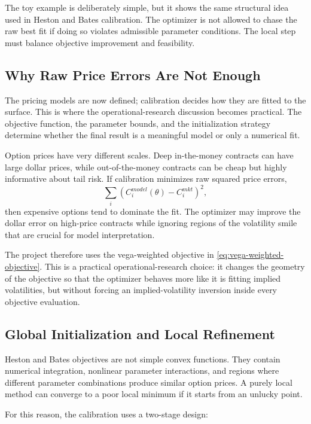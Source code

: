 The toy example is deliberately simple, but it shows the same structural idea used in Heston and Bates calibration. The optimizer is not allowed to chase the raw best fit if doing so violates admissible parameter conditions. The local step must balance objective improvement and feasibility.


\subsection{Why Raw Price Errors Are Not Enough}

The pricing models are now defined; calibration decides how they are fitted to the surface. This is where the operational-research discussion becomes practical. The objective function, the parameter bounds, and the initialization strategy determine whether the final result is a meaningful model or only a numerical fit.

Option prices have very different scales. Deep in-the-money contracts can have large dollar prices, while out-of-the-money contracts can be cheap but highly informative about tail risk. If calibration minimizes raw squared price errors,
\[
    \sum_i \left(C_i^{model}(\theta)-C_i^{mkt}\right)^2,
\]
then expensive options tend to dominate the fit. The optimizer may improve the dollar error on high-price contracts while ignoring regions of the volatility smile that are crucial for model interpretation.

The project therefore uses the vega-weighted objective in \eqref{eq:vega-weighted-objective}. This is a practical operational-research choice: it changes the geometry of the objective so that the optimizer behaves more like it is fitting implied volatilities, but without forcing an implied-volatility inversion inside every objective evaluation.
\subsection{Global Initialization and Local Refinement}

Heston and Bates objectives are not simple convex functions. They contain numerical integration, nonlinear parameter interactions, and regions where different parameter combinations produce similar option prices. A purely local method can converge to a poor local minimum if it starts from an unlucky point.

For this reason, the calibration uses a two-stage design:

